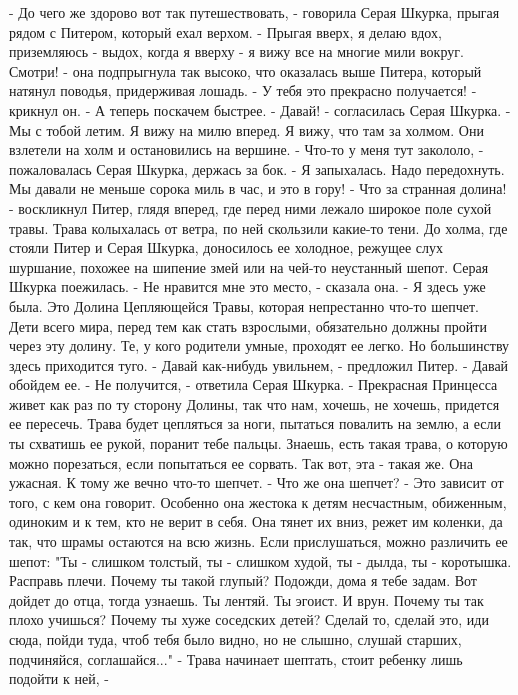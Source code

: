     - До чего же здорово вот так путешествовать, - говорила Серая 
Шкурка, прыгая рядом с Питером, который ехал верхом. - Прыгая вверх, я 
делаю вдох, приземляюсь - выдох, когда я вверху - я вижу все на многие 
мили вокруг. Смотри! - она подпрыгнула так высоко, что оказалась выше 
Питера, который натянул поводья, придерживая лошадь.
    - У тебя это прекрасно получается! - крикнул он. - А теперь 
поскачем быстрее.
    - Давай! - согласилась Серая Шкурка. - Мы с тобой летим. Я вижу на 
милю вперед. Я вижу, что там за холмом.
    Они взлетели на холм и остановились на вершине.
    - Что-то у меня тут закололо, - пожаловалась Серая Шкурка, держась 
за бок. - Я запыхалась. Надо передохнуть. Мы давали не меньше сорока 
миль в час, и это в гору!
    - Что за странная долина! - воскликнул Питер, глядя вперед, где 
перед ними лежало широкое поле сухой травы. Трава колыхалась от ветра, 
по ней скользили какие-то тени. До холма, где стояли Питер и Серая 
Шкурка, доносилось ее холодное, режущее слух шуршание, похожее на 
шипение змей или на чей-то неустанный шепот.
    Серая Шкурка поежилась.
    - Не нравится мне это место, - сказала она. - Я здесь уже была. 
Это Долина Цепляющейся Травы, которая непрестанно что-то шепчет. Дети 
всего мира, перед тем как стать взрослыми, обязательно должны пройти 
через эту долину. Те, у кого родители умные, проходят ее легко. Но 
большинству здесь приходится туго.
    - Давай как-нибудь увильнем, - предложил Питер. - Давай обойдем 
ее.
    - Не получится, - ответила Серая Шкурка. - Прекрасная Принцесса 
живет как раз по ту сторону Долины, так что нам, хочешь, не хочешь, 
придется ее пересечь. Трава будет цепляться за ноги, пытаться повалить 
на землю, а если ты схватишь ее рукой, поранит тебе пальцы. Знаешь, 
есть такая трава, о которую можно порезаться, если попытаться ее 
сорвать. Так вот, эта - такая же. Она ужасная. К тому же вечно что-то 
шепчет.
    - Что же она шепчет?
    - Это зависит от того, с кем она говорит. Особенно она жестока к 
детям несчастным, обиженным, одиноким и к тем, кто не верит в себя. 
Она тянет их вниз, режет им коленки, да так, что шрамы остаются на всю 
жизнь. Если прислушаться, можно различить ее шепот: "Ты - слишком 
толстый, ты - слишком худой, ты - дылда, ты - коротышка. Расправь 
плечи. Почему ты такой глупый? Подожди, дома я тебе задам. Вот дойдет 
до отца, тогда узнаешь. Ты лентяй. Ты эгоист. И врун. Почему ты так 
плохо учишься? Почему ты хуже соседских детей? Сделай то, сделай это, 
иди сюда, пойди туда, чтоб тебя было видно, но не слышно, слушай 
старших, подчиняйся, соглашайся..."
    - Трава начинает шептать, стоит ребенку лишь подойти к ней, - 
